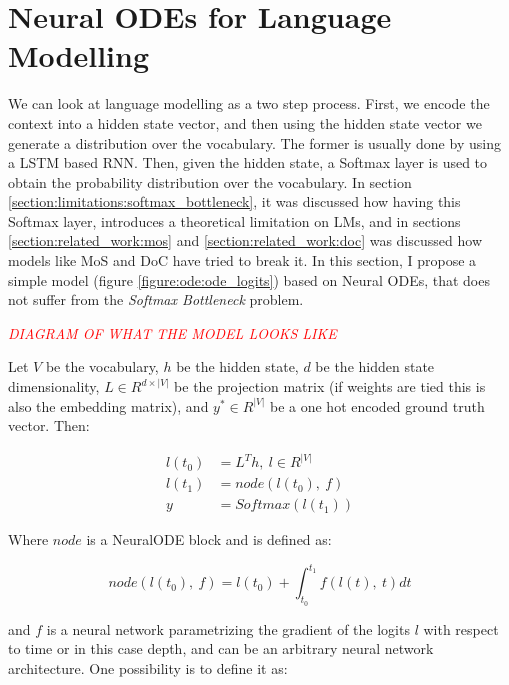 \section{Neural ODEs for Language Modelling}
\label{section:ode:ode_lms}

We can look at language modelling as a two step process. First, we encode the context into a hidden state vector, and then using the hidden state vector we generate a distribution over the vocabulary. The former is usually done by using a LSTM based RNN. Then, given the hidden state, a Softmax layer is used to obtain the probability distribution over the vocabulary. In section \ref{section:limitations:softmax_bottleneck}, it was discussed how having this Softmax layer, introduces a theoretical limitation on LMs, and in sections \ref{section:related_work:mos} and \ref{section:related_work:doc} was discussed how models like MoS \citep{yang2017breaking} and DoC \citep{takase2018direct} have tried to break it. In this section, I propose a simple model (figure \ref{figure:ode:ode_logits}) based on Neural ODEs, that does not suffer from the \emph{Softmax Bottleneck} problem.

\begin{center}
    \textcolor{red}{\emph{DIAGRAM OF WHAT THE MODEL LOOKS LIKE}}
\end{center}

Let $ V $ be the vocabulary, $ h $ be the hidden state, $ d $ be the hidden state dimensionality, $ L \in R^{d \times |V|} $ be the projection matrix (if weights are tied this is also the embedding matrix), and $ y^* \in R^{|V|} $ be a one hot encoded ground truth vector. Then:

\begin{align*}
    l(t_0) &= L^T h, \ l \in R^{|V|} \\
    l(t_1) &= node(l(t_0), \ f) \\
    y &= Softmax(l(t_1))
\end{align*}

Where $ node $ is a NeuralODE block and is defined as:

\begin{displaymath}
    node(l(t_0), \ f) = l(t_0) + \int_{t_0}^{t_1} f(l(t), \ t) dt    
\end{displaymath}

and $ f $ is a neural network parametrizing the gradient of the logits $ l $ with respect to time or in this case depth, and can be an arbitrary neural network architecture. One possibility is to define it as:

